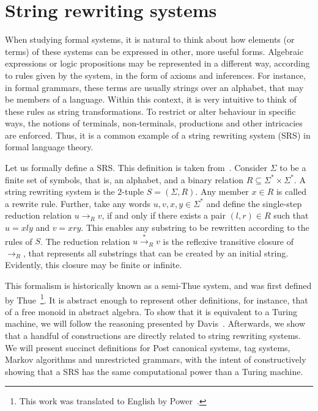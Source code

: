 \documentclass[12pt]{article}
\begin{document}
\section{String rewriting systems}\label{sec:srs}

When studying formal systems, it is natural to think about how elements (or terms) of these systems can be expressed in other, more useful forms. Algebraic expressions or logic propositions may be represented in a different way, according to rules given by the system, in the form of axioms and inferences. For instance, in formal grammars, these terms are usually strings over an alphabet, that may be members of a language. Within this context, it is very intuitive to think of these rules as string transformations. To restrict or alter behaviour in specific ways, the notions of terminals, non-terminals, productions and other intricacies are enforced. Thus, it is a common example of a string rewriting system (SRS) in formal language theory.

Let us formally define a SRS. This definition is taken from~\cite{}. Consider $\Sigma$ to be a finite set of symbols, that is, an alphabet, and a binary relation $R \subseteq \Sigma^{*} \times \Sigma^{*}$. A string rewriting system is the $2$-tuple $S = (\Sigma, R)$. Any member $x \in R$ is called a rewrite rule. Further, take any words $u, v, x, y \in \Sigma^{*}$ and define the single-step reduction relation $u \rightarrow_{R} v$, if and only if there exists a pair $(l, r) \in R$ such that $u = xly$ and $v = xry$. This enables any substring to be rewritten according to the rules of $S$. The reduction relation $u \stackrel{*}{\rightarrow}_{R} v$ is the reflexive transitive closure of $\rightarrow_{R}$, that represents all substrings that can be created by an initial string. Evidently, this closure may be finite or infinite.

This formalism is historically known as a semi-Thue system, and was first defined by Thue~\cite{}\footnote{This work was translated to English by Power~\cite{}.}. It is abstract enough to represent other definitions, for instance, that of a free monoid in abstract algebra. To show that it is equivalent to a Turing machine, we will follow the reasoning presented by Davis~\cite{}. Afterwards, we show that a handful of constructions are directly related to string rewriting systems. We will present succinct definitions for Post canonical systems, tag systems, Markov algorithms and unrestricted grammars, with the intent of constructively showing that a SRS has the same computational power than a Turing machine.
\end{document}
